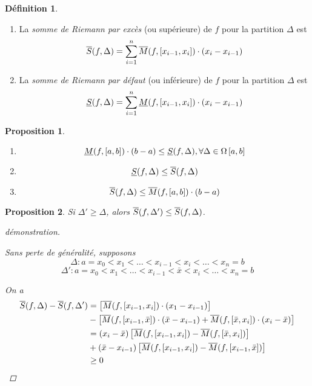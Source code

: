 \documentclass{report}
\newtheorem*{prop}{Proposition}
\theoremstyle{definition}
\newtheorem*{defin}{D\'efinition}
\theoremstyle{remark}
\begin{document}
	\begin{defin}
		~

		\begin{enumerate}[label=\alph*)]
			\item La \emph{somme de Riemann par exc\`es} (ou sup\'erieure) de $f$ pour la partition $\Delta$ est
			\[
			\ssup{f}= \displaystyle\sum_{i=1}^{n}\msup{f}[\left[ x_{i-1},x_i \right]] \cdot (x_i-x_{i-1})
			\]
			\item La \emph{somme de Riemann par d\'efaut} (ou inf\'erieure) de $f$ pour la partition $\Delta$ est
			\[
			\sinf{f}= \displaystyle\sum_{i=1}^{n}\minf{f}[\left[ x_{i-1},x_i \right]] \cdot (x_i-x_{i-1})
			\]
		\end{enumerate}
	\end{defin}

	\newpage
	\begin{prop}
		~

		\begin{enumerate}[label=\alph*)]
			\item
			\[
			\minf{f} \cdot (b-a) \leq \sinf{f}, \forall\Delta\in\partitions
			\]
			\item
			\[
			\sinf{f} \leq \ssup{f}
			\]
			\item
			\[
			\ssup{f} \leq \msup{f} \cdot (b-a)
			\]
		\end{enumerate}
	\end{prop}

	\begin{prop}
		Si $\Delta'\geq\Delta$, alors $\ssup{f}[\Delta']\leq\ssup{f}$.
		\begin{proof}[d\'emonstration]~

			Sans perte de g\'en\'eralit\'e, supposons
			\[
			\Delta:a=x_0<x_1<\dotsc<x_{i-1}<x_i<\dotsc<x_n=b
			\]
			\[
			\Delta':a=x_0<x_1<\dotsc<x_{i-1}<\bar{x}<x_i<\dotsc<x_n=b
			\]

			On a
			\begin{align*}
				\ssup{f}-\ssup{f}[\Delta']&= \left[ \msup{f}[\left[ x_{i-1},x_i \right]] \cdot (x_1-x_{i-1}) \right]\\
				&- \left[ \msup{f}[\left[ x_{i-1},\bar{x} \right]] \cdot (\bar{x}-x_{i-1}) + \msup{f}[\left[ \bar{x},x_i \right]] \cdot (x_i-\bar{x}) \right]\\
				&= (x_i-\bar{x}) \left[ \msup{f}[\left[ x_{i-1},x_i \right]] - \msup{f}[\left[ \bar{x},x_i \right]] \right]\\
				&+ (\bar{x}-x_{i-1}) \left[ \msup{f}[\left[ x_{i-1},x_i \right]] - \msup{f}[\left[ x_{i-1},\bar{x} \right]] \right]\\
				&\geq 0
			\end{align*}
		\end{proof}
	\end{prop}
\end{document}
